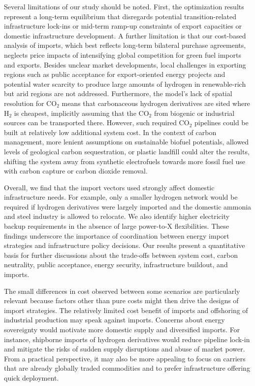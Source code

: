 Several limitations of our study should be noted. First, the optimization
results represent a long-term equilibrium that disregards potential
transition-related infrastructure lock-ins or mid-term ramp-up constraints of
export capacities or domestic infrastructure development. A further limitation
is that our cost-based analysis of imports, which best reflects long-term
bilateral purchase agreements, neglects price impacts of intensifying global
competition for green fuel imports and exports.\cite{galimovaGlobalTrading2023a}
Besides unclear market developments, local challenges in exporting regions such
as public acceptance for export-oriented energy
projects\cite{ishmamMappingLocalGreen2024} and potential water
scarcity\cite{franzmannGreenHydrogenCostpotentials2023,terlouwFutureHydrogenEconomies2024}
to produce large amounts of hydrogen in renewable-rich but arid regions are not
addressed. Furthermore, the model's lack of spatial resolution for CO$_2$ means
that carbonaceous hydrogen derivatives are sited where H$_2$ is cheapest,
implicitly assuming that the CO$_2$ from biogenic or industrial sources can be
transported there. However, such required CO$_2$ pipelines could be built at
relatively low additional system cost.\cite{hofmannH2CO2Network2024} In the
context of carbon management, more lenient assumptions on sustainable biofuel
potentials, allowed levels of geological carbon sequestration, or plastic
landfill could alter the results, shifting the system away from synthetic
electrofuels towards more fossil fuel use with carbon capture or carbon dioxide
removal.\cite{hofmannH2CO2Network2024,millingerDiversityBiomassUsage2023}

Overall, we find that the import vectors used strongly affect domestic
infrastructure needs. For example, only a smaller hydrogen network would be
required if hydrogen derivatives were largely imported and the domestic ammonia
and steel industry is allowed to relocate. We also identify higher electricity
backup requirements in the absence of large power-to-X flexibilities. These
findings underscore the importance of coordination between energy import
strategies and infrastructure policy decisions. Our results present a
quantitative basis for further discussions about the trade-offs between system
cost, carbon neutrality, public acceptance, energy security, infrastructure
buildout, and imports.

The small differences in cost observed between some scenarios are particularly
relevant because factors other than pure costs might then drive the designs of
import strategies. The relatively limited cost benefit of imports and offshoring
of industrial production may speak against imports. Concerns about energy
sovereignty would motivate more domestic supply and diversified imports. For
instance, shipborne imports of hydrogen derivatives would reduce pipeline
lock-in and mitigate the risks of sudden supply disruptions and abuse of market
power. From a practical perspective, it may also be more appealing to focus on
carriers that are already globally traded commodities and to prefer
infrastructure offering quick deployment.

